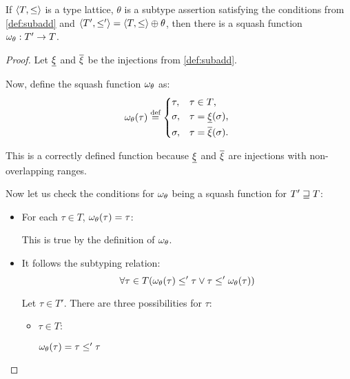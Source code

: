 \documentclass[main.tex]{subfiles}
\begin{document}
\begin{lemma}
    \label{lemma:subadd:squash}
    If $\langle  T,  \leq  \rangle$ is a type lattice, $\theta$
    is a subtype assertion satisfying the conditions from \cref{def:subadd}
    and $\langle  T',  \leq'  \rangle = \langle  T,  \leq  \rangle \oplus \theta$, then
    there is a squash function $\omega_{\theta} : T' \rightarrow T$.
\end{lemma}
\begin{proof}
    Let $\underline{\xi}$ and $\overline{\xi}$ be the injections from \cref{def:subadd}.

    Now, define the squash function $\omega_{\theta}$ as:
    \[
        \squash_{\theta}(\tau) \defeq
        \begin{cases*}
            \tau ,& $\tau \in T$, \\
            \sigma ,& $\tau = \subtyper{\xi}(\sigma)$, \\
            \sigma ,& $\tau = \suptyper{\xi}(\sigma)$. \\
        \end{cases*}
    \]

    This is a correctly defined function because $\underline{\xi}$ and
    $\overline{\xi}$ are injections with non-overlapping ranges.

    Now let us check the conditions for $\omega_{\theta}$
    being a squash function for $T' \sqsupseteq T$:

    \begin{itemize}
        \item For each $\tau \in T$, $\omega_{\theta}(\tau) = \tau$:

            This is true by the definition of $\omega_{\theta}$.

        \item It follows the subtyping relation:
            \[ \forall \tau \in T
                (\omega_{\theta}(\tau) \leq' \tau \lor \tau \leq' \omega_{\theta}(\tau)) \]

            Let $\tau \in T'$. There are three possibilities for $\tau$:
            \begin{itemize}
                \item $\tau \in T$:

                    $\omega_{\theta}(\tau) = \tau \leq' \tau$


\end{itemize}
\end{itemize}
\end{proof}
\end{document}
